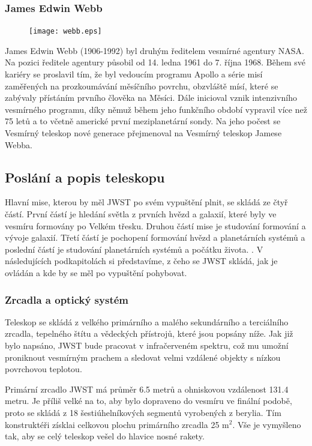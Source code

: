 \documentclass[a4paper,11pt]{article}
\begin{document}
\subsubsection{James Edwin Webb}
\begin{figure}
\texttt{[image: webb.eps]}
\end{figure}
James Edwin Webb (1906-1992) byl druhým ředitelem vesmírné agentury NASA. Na pozici ředitele agentury působil od 14. ledna 1961 do 7. října 1968. Během své kariéry se proslavil tím, že byl vedoucím programu Apollo a série misí zaměřených na prozkoumávání měsíčního povrchu, obzvláště mísí, které se zabývaly přístáním prvního člověka na Měsíci. 
Dále inicioval vznik intenzivního vesmírného programu, díky němuž během jeho funkčního období vypravil více než 75 letů a to včetně americké první meziplanetární sondy. Na jeho počest se Vesmírný teleskop nové generace přejmenoval na Vesmírný teleskop Jamese Webba.
\\

\subsection{Poslání a popis teleskopu}
Hlavní mise, kterou by měl JWST po svém vypuštění plnit, se skládá ze čtyř částí.  První částí je hledání světla z prvních hvězd a galaxií, které byly ve vesmíru formovány po Velkém třesku. Druhou částí mise je studování formování a vývoje galaxií. Třetí částí je pochopení formování hvězd a planetárních systémů a poslední částí je studování planetárních systémů a počátku života. \cite{wikipediaWebbEn}. V následujících podkapitolách si představíme, z čeho se JWST skládá, jak je ovládán a kde by se měl po vypuštění pohybovat.

\subsubsection{Zrcadla a optický systém}
Teleskop se skládá z velkého primárního a malého sekundárního a terciálního zrcadla, tepelného štítu a věde\-ckých přístrojů, které jsou popsány níže. Jak již bylo napsáno, JWST bude pracovat v infračerveném spektru, což mu umožní proniknout vesmírným prachem a sledovat velmi vzdálené objekty s nízkou povrchovou teplotou.

Primární zrcadlo JWST má průměr 6.5 metrů a ohniskovou vzdálenost 131.4 metru. Je příliš velké na to, aby bylo dopraveno do vesmíru ve finální podobě, proto se skládá z 18 šestiúhelníkových segmentů vyrobených z berylia. Tím konstruktéři získlai celkovou plochu primárního zrcadla 25 m$^2$. Vše je vymyšleno tak, aby se celý teleskop vešel do hlavice nosné rakety.
\end{document}
